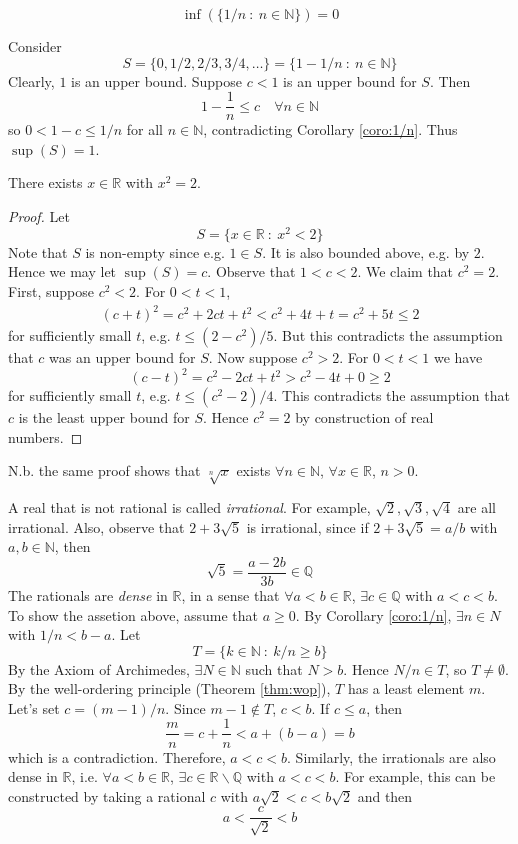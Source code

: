 \documentclass[10pt, a4paper, twoside]{report}
\begin{document}
\[\inf(\{1/n\::\:n\in\mathbb{N}\})=0\]
\begin{example}
    Consider 
    \[S=\{0,1/2,2/3,3/4,\ldots\}=\{1-1/n\::\:n\in\mathbb{N}\}\]
    Clearly, \(1\) is an upper bound. Suppose \(c<1\) is an upper bound for \(S\). Then 
    \[1-\frac 1n\leq c\quad\forall n\in\mathbb{N}\]
    so \(0<1-c\leq 1/n\) for all \(n\in\mathbb{N}\), contradicting Corollary \ref{coro:1/n}. Thus \(\sup(S)=1\).
\end{example}
\begin{theorem}
    There exists \(x\in\mathbb{R}\) with \(x^2=2\).
\end{theorem}
\begin{proof}
    Let 
    \[S=\{x\in\mathbb{R}\::\:x^2<2\}\]
    Note that \(S\) is non-empty since e.g. \(1\in S\). It is also bounded above, e.g. by \(2\). Hence we may let \(\sup(S)=c\). Observe that \(1<c<2\). We claim that \(c^2=2\). First, suppose \(c^2<2\). For \(0<t<1\),
    \begin{align*}
        (c+t)^2=c^2+2ct+t^2<c^2+4t+t=c^2+5t\leq 2
    \end{align*}
    for sufficiently small \(t\), e.g. \(t\leq (2-c^2)/5\). But this contradicts the assumption that \(c\) was an upper bound for \(S\). Now suppose \(c^2>2\). For \(0<t<1\) we have
    \[(c-t)^2=c^2-2ct+t^2>c^2-4t+0\geq 2\]
    for sufficiently small \(t\), e.g. \(t\leq(c^2-2)/4\). This contradicts the assumption that \(c\) is the least upper bound for \(S\). Hence \(c^2=2\) by construction of real numbers.
\end{proof}
N.b. the same proof shows that \(\sqrt[n]{x}\) exists \(\forall n\in\mathbb{N}\), \(\forall x\in\mathbb{R}\), \(n>0\).

A real that is not rational is called \emph{irrational}. For example, \(\sqrt{2},\sqrt{3},\sqrt{4}\) are all irrational. Also, observe that \(2+3\sqrt{5}\) is irrational, since if \(2+3\sqrt{5}=a/b\) with \(a,b\in\mathbb{N}\), then 
\[\sqrt{5}=\frac{a-2b}{3b}\in\mathbb{Q}\]
The rationals are \emph{dense} in \(\mathbb{R}\), in a sense that \(\forall a<b\in\mathbb{R}\), \(\exists c\in\mathbb{Q}\) with \(a<c<b\). To show the assetion above, assume that \(a\geq 0\). By Corollary \ref{coro:1/n}, \(\exists n\in N\) with \(1/n<b-a\). Let 
\[T=\{k\in\mathbb{N}\::\:k/n\geq b\}\]
By the Axiom of Archimedes, \(\exists N\in\mathbb{N}\) such that \(N>b\). Hence \(N/n\in T\), so \(T\neq\emptyset\). By the well-ordering principle (Theorem \ref{thm:wop}), \(T\) has a least element \(m\). Let's set \(c=(m-1)/n\). Since \(m-1\notin T\), \(c<b\). If \(c\leq a\), then 
\[\frac mn=c+\frac 1n<a+(b-a)=b\]
which is a contradiction. Therefore, \(a<c<b\). Similarly, the irrationals are also dense in \(\mathbb{R}\), i.e. \(\forall a<b\in\mathbb{R}\), \(\exists c\in\mathbb{R}\backslash\mathbb{Q}\) with \(a<c<b\). For example, this can be constructed by taking a rational \(c\) with \(a\sqrt{2}<c<b\sqrt{2}\) and then
\[a<\frac{c}{\sqrt{2}}<b\]
\end{document}
